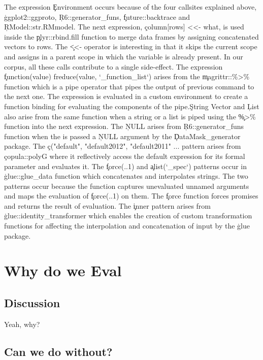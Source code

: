 \documentclass[acmsmall]{acmart}
\begin{document}
The expression \c{Environment} occurs because of the four callsites
explained above, \c{ggplot2::ggproto}, \c{R6::generator_funs},
\c{future::backtrace} and \c{RModel::str.RMmodel}. The next
expression, \c{column[rows] <<- what}, is used inside the
\c{plyr::rbind.fill} function to merge data frames by assigning
concatenated vectors to rows. The \c{<<-} operator is interesting in
that it skips the current scope and assigns in a parent scope in which
the variable is already present. In our corpus, all these \eval calls
contribute to a single side-effect. The expression \c{function(value)
  freduce(value, `_function_list`)} arises from the
\c{magrittr::\%>\%} function which is a pipe operator that pipes the
output of previous command to the next one. The expression is
evaluated in a custom environment to create a function binding for
evaluating the components of the pipe.\c{String Vector} and \c{List}
also arise from the same function when a string or a list is piped
using the \c{\%>\%} function into the next expression. The \c{NULL}
arises from \c{R6::generator_funs} function when the \eval is passed a
\c{NULL} argument by the \c{DataMask_generator} package. The
\c{c("default", "default2012", "default2011" ...} pattern arises from
\c{copula::polyG} where it reflectively access the default expression
for its formal parameter and evaluates it. The \c{force(..1)} and
\c{alist(`_spec`)} patterns occur in \c{glue::glue_data} function
which concatenates and interpolates strings. The two patterns occur
because the function captures unevaluated unnamed arguments and maps
the evaluation of \c{force(..1)} on them. The \c{force} function
forces promises and returns the result of evaluation. The \c{inner}
pattern arises from \c{glue::identity_transformer} which enables the
creation of custom transformation functions for affecting the
interpolation and concatenation of input by the \c{glue} package.


\section{Why do we Eval}

\subsection{Discussion}

Yeah, why?

\subsection{Can we do without?}
\end{document}
